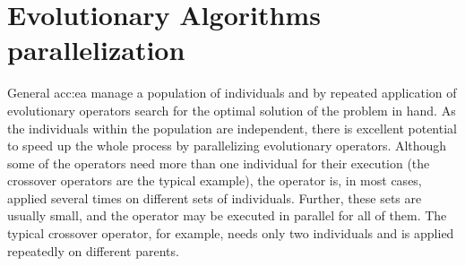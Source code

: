 \section{Evolutionary Algorithms parallelization}

General \acrlong{acc:ea} manage a population of individuals and by repeated application of evolutionary operators search for the optimal solution of the problem in hand. As the individuals within the population are independent, there is excellent potential to speed up the whole process by parallelizing evolutionary operators. Although some of the operators need more than one individual for their execution (the crossover operators are the typical example), the operator is, in most cases, applied several times on different sets of individuals. Further, these sets are usually small, and the operator may be executed in parallel for all of them. The typical crossover operator, for example, needs only two individuals and is applied repeatedly on different parents.

